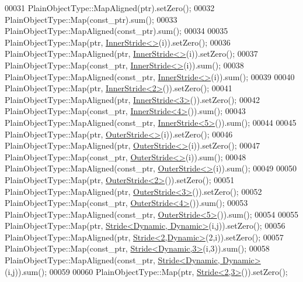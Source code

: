 \begin{DoxyCode}
00031     PlainObjectType::MapAligned(ptr).setZero();
00032     PlainObjectType::Map(const\_ptr).sum();
00033     PlainObjectType::MapAligned(const\_ptr).sum();
00034 
00035     PlainObjectType::Map(ptr, \hyperlink{class_eigen_1_1_inner_stride}{InnerStride<>}(i)).setZero();
00036     PlainObjectType::MapAligned(ptr, \hyperlink{class_eigen_1_1_inner_stride}{InnerStride<>}(i)).setZero();
00037     PlainObjectType::Map(const\_ptr, \hyperlink{class_eigen_1_1_inner_stride}{InnerStride<>}(i)).sum();
00038     PlainObjectType::MapAligned(const\_ptr, \hyperlink{class_eigen_1_1_inner_stride}{InnerStride<>}(i)).sum();
00039 
00040     PlainObjectType::Map(ptr, \hyperlink{class_eigen_1_1_inner_stride}{InnerStride<2>}()).setZero();
00041     PlainObjectType::MapAligned(ptr, \hyperlink{class_eigen_1_1_inner_stride}{InnerStride<3>}()).setZero();
00042     PlainObjectType::Map(const\_ptr, \hyperlink{class_eigen_1_1_inner_stride}{InnerStride<4>}()).sum();
00043     PlainObjectType::MapAligned(const\_ptr, \hyperlink{class_eigen_1_1_inner_stride}{InnerStride<5>}()).sum();
00044 
00045     PlainObjectType::Map(ptr, \hyperlink{class_eigen_1_1_outer_stride}{OuterStride<>}(i)).setZero();
00046     PlainObjectType::MapAligned(ptr, \hyperlink{class_eigen_1_1_outer_stride}{OuterStride<>}(i)).setZero();
00047     PlainObjectType::Map(const\_ptr, \hyperlink{class_eigen_1_1_outer_stride}{OuterStride<>}(i)).sum();
00048     PlainObjectType::MapAligned(const\_ptr, \hyperlink{class_eigen_1_1_outer_stride}{OuterStride<>}(i)).sum();
00049 
00050     PlainObjectType::Map(ptr, \hyperlink{class_eigen_1_1_outer_stride}{OuterStride<2>}()).setZero();
00051     PlainObjectType::MapAligned(ptr, \hyperlink{class_eigen_1_1_outer_stride}{OuterStride<3>}()).setZero();
00052     PlainObjectType::Map(const\_ptr, \hyperlink{class_eigen_1_1_outer_stride}{OuterStride<4>}()).sum();
00053     PlainObjectType::MapAligned(const\_ptr, \hyperlink{class_eigen_1_1_outer_stride}{OuterStride<5>}()).sum();
00054 
00055     PlainObjectType::Map(ptr, \hyperlink{group___core___module_class_eigen_1_1_stride}{Stride<Dynamic, Dynamic>}(i,j)).setZero();
00056     PlainObjectType::MapAligned(ptr, \hyperlink{group___core___module_class_eigen_1_1_stride}{Stride<2,Dynamic>}(2,i)).setZero();
00057     PlainObjectType::Map(const\_ptr, \hyperlink{group___core___module_class_eigen_1_1_stride}{Stride<Dynamic,3>}(i,3)).sum();
00058     PlainObjectType::MapAligned(const\_ptr, \hyperlink{group___core___module_class_eigen_1_1_stride}{Stride<Dynamic, Dynamic>}(i,j)).sum();
00059 
00060     PlainObjectType::Map(ptr, \hyperlink{group___core___module_class_eigen_1_1_stride}{Stride<2,3>}()).setZero();

\end{DoxyCode}
